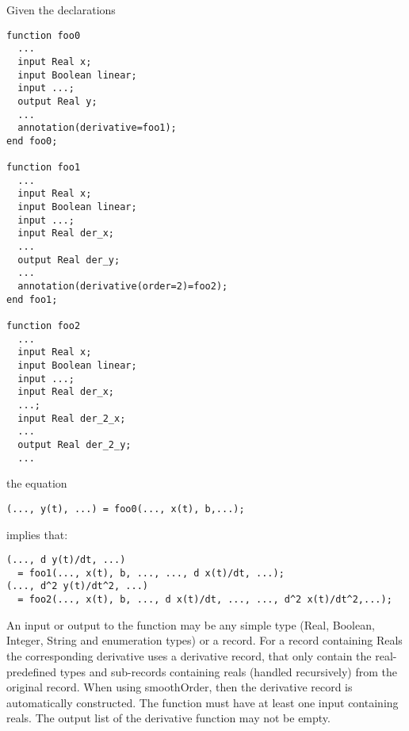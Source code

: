\begin{example}
Given the declarations
\begin{lstlisting}[language=modelica]
function foo0
  ...
  input Real x;
  input Boolean linear;
  input ...;
  output Real y;
  ...
  annotation(derivative=foo1);
end foo0;

function foo1
  ...
  input Real x;
  input Boolean linear;
  input ...;
  input Real der_x;
  ...
  output Real der_y;
  ...
  annotation(derivative(order=2)=foo2);
end foo1;

function foo2
  ...
  input Real x;
  input Boolean linear;
  input ...;
  input Real der_x;
  ...;
  input Real der_2_x;
  ...
  output Real der_2_y;
  ...
\end{lstlisting}
the equation
\begin{lstlisting}[language=modelica]
(..., y(t), ...) = foo0(..., x(t), b,...);
\end{lstlisting}
implies that:
\begin{lstlisting}[language=modelica]
(..., d y(t)/dt, ...)
  = foo1(..., x(t), b, ..., ..., d x(t)/dt, ...);
(..., d^2 y(t)/dt^2, ...)
  = foo2(..., x(t), b, ..., d x(t)/dt, ..., ..., d^2 x(t)/dt^2,...);
\end{lstlisting}
\end{example}

An input or output to the function may be any simple type (Real,
Boolean, Integer, String and enumeration types) or a record. For a
record containing Reals the corresponding derivative uses a derivative
record, that only contain the real-predefined types and sub-records
containing reals (handled recursively) from the original record. When
using smoothOrder, then the derivative record is automatically
constructed. The function must have at least one input containing reals.
The output list of the derivative function may not be empty.


